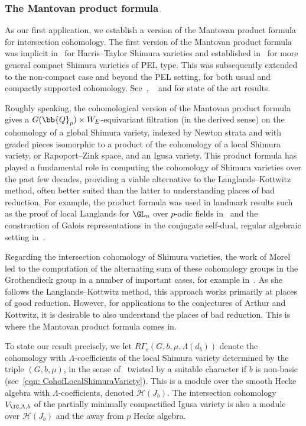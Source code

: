 \documentclass[letterpaper,11pt]{amsart}
\begin{document}
\subsubsection{The Mantovan product formula} As our first application, we establish a version of the Mantovan product formula for intersection cohomology. The first version of the Mantovan product formula was implicit in~\cite{HT} for Harris--Taylor Shimura varieties and established in~\cite{mantovan-thesis, mantovan-PEL} for more general compact Shimura varieties of PEL type. This was subsequently extended to the non-compact case and beyond the PEL setting, for both usual and compactly supported cohomology. See~\cite[Theorem 7.1]{KoTorsionPaper}, ~\cite[Theorem 1.15]{HamannLeeTorsion} and \cite[Theorem 8.5.7]{DvHKZ} for state of the art results. 

Roughly speaking, the cohomological version of the Mantovan product formula gives a $G(\bb{Q}_{p}) \times W_{E}$-equivariant filtration (in the derived sense) on the cohomology of a global Shimura variety, indexed by Newton strata and with graded pieces isomorphic to a product of the cohomology of a local Shimura variety, or Rapoport--Zink space, and an Igusa variety. This product formula has played a fundamental role in computing the cohomology of Shimura varieties over the past few decades, providing a viable alternative to the Langlands--Kottwitz method, often better suited than the latter to understanding places of bad reduction. For example, the product formula was used in landmark results such as the proof of local Langlands for $\GL_n$ over $p$-adic fields in~\cite{HT} and the construction of Galois representations in the conjugate self-dual, regular algebraic setting in~\cite{shin-galois}. 

Regarding the intersection cohomology of Shimura varieties, the work of Morel led to the computation of the alternating sum of these cohomology groups in the Grothendieck group in a number of important cases, for example in~\cite{morel-cohomology}. As she follows the Langlands--Kottwitz method, this approach works primarily at places of good reduction. However, for applications to the conjectures of Arthur and Kottwitz, it is desirable to also understand the places of bad reduction. This is where the Mantovan product formula comes in. 

To state our result precisely, we let $R\Gamma_c(G,b,\mu,\Lambda(d_{b}))$ denote the cohomology with $\Lambda$-coefficients of the local Shimura variety determined by the triple $(G, b, \mu)$, in the sense of~\cite{Scholze-Weinstein} twisted by a suitable character if $b$ is non-basic (see~\eqref{eqn: CohofLocalShimuraVariety}). This is a module over the smooth Hecke algebra with $\Lambda$-coefficients, denoted $\mathcal{H}(J_b)$. The intersection cohomology $V_{\IC,\Lambda,b}$ of the partially minimally compactified Igusa variety is also a module over $\mathcal{H}(J_b)$ and the away from $p$ Hecke algebra. 
\end{document}
